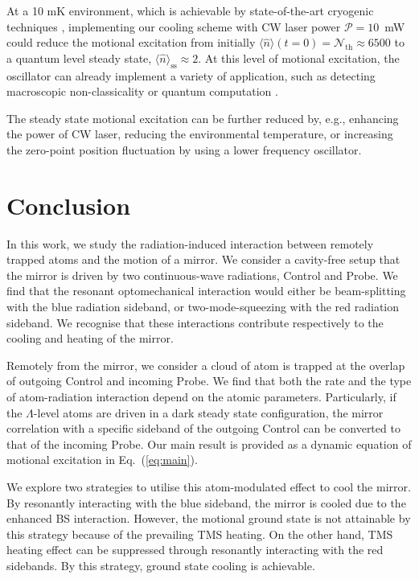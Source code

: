 \documentclass[aps, pra, reprint, amsmath, amssymb, groupedaddress, acknowledgments]{revtex4-1}
\begin{document}
At a 10 mK environment, which is achievable by state-of-the-art cryogenic techniques \cite{book:cool}, implementing our cooling scheme with CW laser power $\mathcal{P}=10$~mW could reduce the motional excitation from initially $\langle \hat{n} \rangle(t=0)=\mathcal{N}_\textrm{th}\approx 6500$ to a quantum level steady state, $\langle \hat{n}\rangle_\textrm{ss} \approx 2$.  At this level of motional excitation, the oscillator can already implement a variety of application, such as detecting macroscopic non-classicality \cite{2016PhRvA..94a3850M} or quantum computation \cite{Lau:2017et}.  

The steady state motional excitation can be further reduced by, e.g., enhancing the power of CW laser, reducing the environmental temperature, or increasing the zero-point position fluctuation by using a lower frequency oscillator.


\section{Conclusion \label{sec:conclusion}}

In this work, we study the radiation-induced interaction between remotely trapped atoms and the motion of a mirror.  We consider a cavity-free setup that the mirror is driven by two continuous-wave radiations, Control and Probe.  We find that the resonant optomechanical interaction would either be beam-splitting with the blue radiation sideband, or two-mode-squeezing with the red radiation sideband.  We recognise that these interactions contribute respectively to the cooling and heating of the mirror.

Remotely from the mirror, we consider a cloud of atom is trapped at the overlap of outgoing Control and incoming Probe.  We find that both the rate and the type of atom-radiation interaction depend on the atomic parameters.  Particularly, if the $\Lambda$-level atoms are driven in a dark steady state configuration, the mirror correlation with a specific sideband of the outgoing Control can be converted to that of the incoming Probe.  Our main result is provided as a dynamic equation of motional excitation in Eq.~(\ref{eq:main}).

We explore two strategies to utilise this atom-modulated effect to cool the mirror.  By resonantly interacting with the blue sideband, the mirror is cooled due to the enhanced BS interaction.  However, the motional ground state is not attainable by this strategy because of the prevailing TMS heating.  On the other hand, TMS heating effect can be suppressed through resonantly interacting with the red sidebands.  By this strategy, ground state cooling is achievable.
\end{document}
